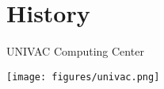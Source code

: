 \section{History}

\begin{frame}{UNIVAC Computing Center}
\begin{center}
\texttt{[image: figures/univac.png]}
\end{center}
\end{frame}

